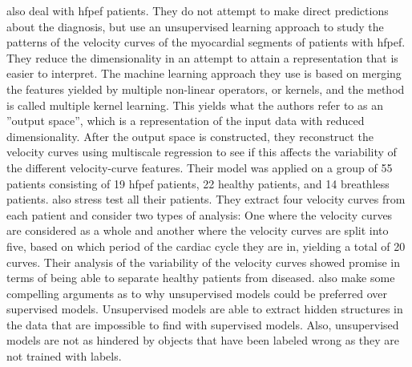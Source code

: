 \textcite{myocardial_motion_pattern} also deal with \acrshort{hfpef} patients. They do not attempt to make direct predictions about the diagnosis, but use an unsupervised learning approach to study the patterns of the velocity curves of the myocardial segments of patients with \acrshort{hfpef}. They reduce the dimensionality in an attempt to attain a representation that is easier to interpret. The machine learning approach they use is based on merging the features yielded by multiple non-linear operators, or kernels, and the method is called multiple kernel learning. This yields what the authors refer to as an ''output space'', which is a representation of the input data with reduced dimensionality. After the output space is constructed, they reconstruct the velocity curves using multiscale regression to see if this affects the variability of the different velocity-curve features. Their model was applied on a group of 55 patients consisting of 19 \acrshort{hfpef} patients, 22 healthy patients, and 14 breathless patients. \textcite{myocardial_motion_pattern} also stress test all their patients. They extract four velocity curves from each patient and consider two types of analysis: One where the velocity curves are considered as a whole and another where the velocity curves are split into five, based on which period of the cardiac cycle they are in, yielding a total of 20 curves. Their analysis of the variability of the velocity curves showed promise in terms of being able to separate healthy patients from diseased. \textcite{myocardial_motion_pattern} also make some compelling arguments as to why unsupervised models could be preferred over supervised models. Unsupervised models are able to extract hidden structures in the data that are impossible to find with supervised models. Also, unsupervised models are not as hindered by objects that have been labeled wrong as they are not trained with labels. \bigskip

